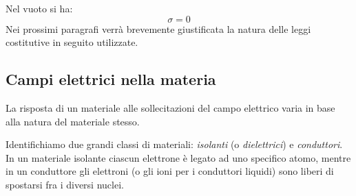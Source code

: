 Nel vuoto si ha:
\[
\sigma=0
\]
Nei prossimi paragrafi verrà brevemente giustificata la natura delle leggi costitutive in seguito utilizzate.


\subsection{Campi elettrici nella materia}
\label{subsec:elecmateria}
La risposta di un materiale alle sollecitazioni del campo elettrico varia in base alla natura del materiale stesso. 

Identifichiamo due grandi classi di materiali: \textit{isolanti} (o \textit{dielettrici}) e \textit{conduttori}. In un materiale isolante ciascun elettrone è legato ad uno specifico atomo, mentre in un conduttore gli elettroni (o gli ioni per i conduttori liquidi) sono liberi di spostarsi fra i diversi nuclei.
